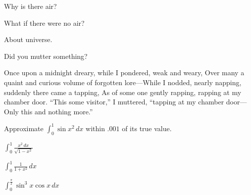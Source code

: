 \begin{questions}
    \question[10] Why is there air?
    \ansarea{1in}

    \question What if there were no air?
    \ansarea{1.5in}

    \question[20] About universe.
    \ansarea{1.5in}

    \question Did you mutter something?
    \begin{solarea}
        Once upon a midnight dreary, while I pondered, weak and weary,
        Over many a quaint and curious volume of forgotten lore---While I
        nodded, nearly napping, suddenly there came a tapping, As of some
        one gently rapping, rapping at my chamber door. ``This some
        visitor,'' I muttered, ``tapping at my chamber door---Only this
        and nothing more.''
    \end{solarea}
\end{questions}

\begin{questions}
    \question Approximate $\displaystyle \int_0^1 \sin x^2 \, dx$ within $.001$ of its true value.


    \question\label{Q:exact-start} $\int_0^1 \frac{x^2\,dx}{\sqrt{1-x^2}}$

    \question $\int_0^1 \frac{1}{1+x^2}\,dx$

    \question\label{Q:exact-end} $\int_0^{\frac{\pi}{2}}\sin^3 x\cos x\,dx$
\end{questions}
